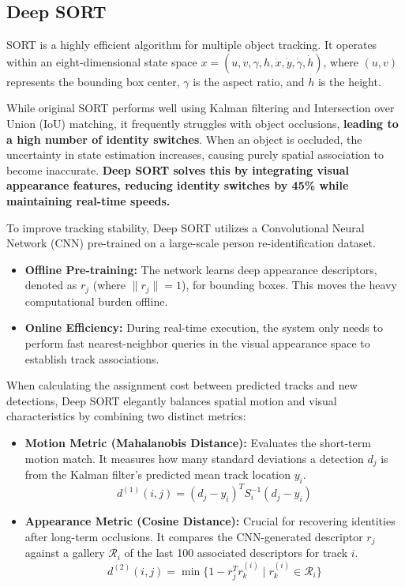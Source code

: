 \documentclass[10pt,twocolumn,letterpaper]{article}
\begin{document}
\subsection{Deep SORT}
SORT is a highly efficient algorithm for multiple object tracking. It operates within an eight-dimensional state space $x = (u,v,\gamma,h,\dot{x},\dot{y},\dot{\gamma},\dot{h})$, where $(u, v)$ represents the bounding box center, $\gamma$ is the aspect ratio, and $h$ is the height. 

While original SORT performs well using Kalman filtering and Intersection over Union (IoU) matching, it frequently struggles with object occlusions, \textbf{leading to a high number of identity switches}. When an object is occluded, the uncertainty in state estimation increases, causing purely spatial association to become inaccurate. \textbf{\cite{deepsort}Deep SORT solves this by integrating visual appearance features, reducing identity switches by 45\% while maintaining real-time speeds.}

To improve tracking stability, Deep SORT utilizes a Convolutional Neural Network (CNN) pre-trained on a large-scale person re-identification dataset. 

\begin{itemize}
    \item \textbf{Offline Pre-training:} The network learns deep appearance descriptors, denoted as $r_j$ (where $\|r_j\| = 1$), for bounding boxes. This moves the heavy computational burden offline.
    \item \textbf{Online Efficiency:} During real-time execution, the system only needs to perform fast nearest-neighbor queries in the visual appearance space to establish track associations.
\end{itemize}

When calculating the assignment cost between predicted tracks and new detections, Deep SORT elegantly balances spatial motion and visual characteristics by combining two distinct metrics:

\begin{itemize}
    \item \textbf{Motion Metric (Mahalanobis Distance):} 
    Evaluates the short-term motion match. It measures how many standard deviations a detection $d_j$ is from the Kalman filter's predicted mean track location $y_i$.
    \begin{equation}
        d^{(1)}(i,j) = (d_j - y_i)^T S_i^{-1} (d_j - y_i)
    \end{equation}
    
    \item \textbf{Appearance Metric (Cosine Distance):} 
    Crucial for recovering identities after long-term occlusions. It compares the CNN-generated descriptor $r_j$ against a gallery $\mathcal{R}_i$ of the last 100 associated descriptors for track $i$.
    \begin{equation}
        d^{(2)}(i,j) = \min \{1 - r_j^T r_k^{(i)} \mid r_k^{(i)} \in \mathcal{R}_i\}
    \end{equation}
\end{itemize}
\end{document}

